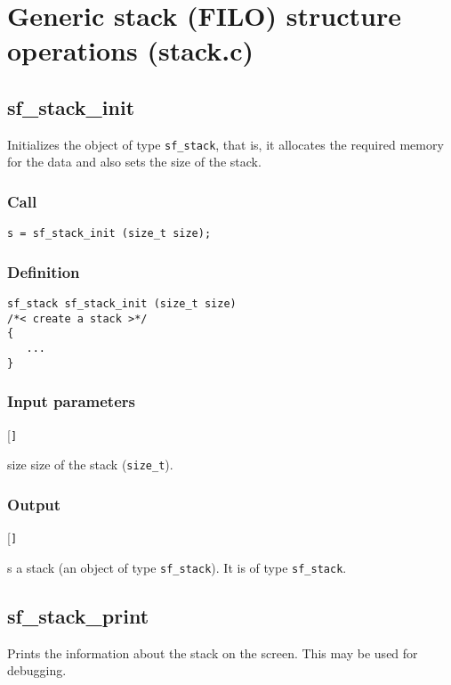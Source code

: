 \section{Generic stack (FILO) structure operations (stack.c)}




\subsection{{sf\_stack\_init}}
Initializes the object of type \texttt{sf\_stack}, that is, it allocates the required memory for the data and also sets the size of the stack.

\subsubsection*{Call}
\begin{verbatim}s = sf_stack_init (size_t size);\end{verbatim}

\subsubsection*{Definition}
\begin{verbatim}
sf_stack sf_stack_init (size_t size)
/*< create a stack >*/
{
   ...
}
\end{verbatim}

\subsubsection*{Input parameters}
\begin{desclist}{\tt }{\quad}[\tt ]
   \setlength\itemsep{0pt}
   \item[size] size of the stack (\texttt{size\_t}).  
\end{desclist}

\subsubsection*{Output}
\begin{desclist}{\tt }{\quad}[\tt ]
   \setlength\itemsep{0pt}
   \item[s] a stack (an object of type \texttt{sf\_stack}). It is of type \texttt{sf\_stack}.
\end{desclist}




\subsection{{sf\_stack\_print}}
Prints the information about the stack on the screen. This may be used for debugging.

